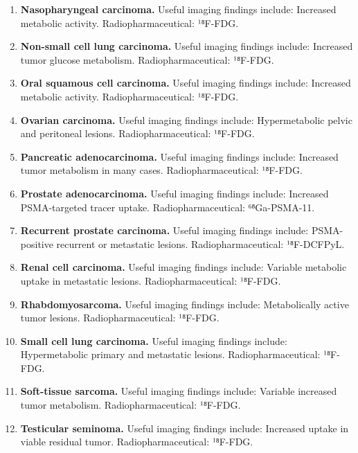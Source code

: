 \begin{enumerate}[leftmargin=*,itemsep=0.45em,topsep=0.4em]
\item \textbf{Nasopharyngeal carcinoma.} Useful imaging findings include: Increased metabolic activity. Radiopharmaceutical: ¹⁸F-FDG.
\item \textbf{Non-small cell lung carcinoma.} Useful imaging findings include: Increased tumor glucose metabolism. Radiopharmaceutical: ¹⁸F-FDG.
\item \textbf{Oral squamous cell carcinoma.} Useful imaging findings include: Increased metabolic activity. Radiopharmaceutical: ¹⁸F-FDG.
\item \textbf{Ovarian carcinoma.} Useful imaging findings include: Hypermetabolic pelvic and peritoneal lesions. Radiopharmaceutical: ¹⁸F-FDG.
\item \textbf{Pancreatic adenocarcinoma.} Useful imaging findings include: Increased tumor metabolism in many cases. Radiopharmaceutical: ¹⁸F-FDG.
\item \textbf{Prostate adenocarcinoma.} Useful imaging findings include: Increased PSMA-targeted tracer uptake. Radiopharmaceutical: ⁶⁸Ga-PSMA-11.
\item \textbf{Recurrent prostate carcinoma.} Useful imaging findings include: PSMA-positive recurrent or metastatic lesions. Radiopharmaceutical: ¹⁸F-DCFPyL.
\item \textbf{Renal cell carcinoma.} Useful imaging findings include: Variable metabolic uptake in metastatic lesions. Radiopharmaceutical: ¹⁸F-FDG.
\item \textbf{Rhabdomyosarcoma.} Useful imaging findings include: Metabolically active tumor lesions. Radiopharmaceutical: ¹⁸F-FDG.
\item \textbf{Small cell lung carcinoma.} Useful imaging findings include: Hypermetabolic primary and metastatic lesions. Radiopharmaceutical: ¹⁸F-FDG.
\item \textbf{Soft-tissue sarcoma.} Useful imaging findings include: Variable increased tumor metabolism. Radiopharmaceutical: ¹⁸F-FDG.
\item \textbf{Testicular seminoma.} Useful imaging findings include: Increased uptake in viable residual tumor. Radiopharmaceutical: ¹⁸F-FDG.
\end{enumerate}

